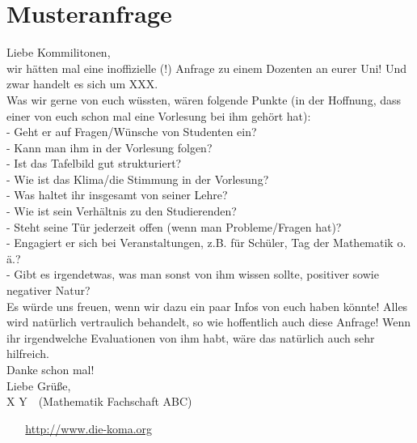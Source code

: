 \documentclass[10pt,twoside,a5paper,openright]{book}
\begin{document}
\section{Musteranfrage}\label{musteranfrage_txt}
\begin{center}
\parbox{0.9\textwidth}{\ttfamily
Liebe Kommilitonen,\medskip\\
wir hätten mal eine inoffizielle (!) Anfrage zu einem Dozenten an eurer Uni! Und zwar handelt es sich um XXX.\medskip\\
Was wir gerne von euch wüssten, wären folgende Punkte (in der Hoffnung, dass einer von euch schon mal eine Vorlesung bei ihm gehört hat):\smallskip\\
- Geht er auf Fragen/Wünsche von Studenten ein?\\
- Kann man ihm in der Vorlesung folgen?\\
- Ist das Tafelbild gut strukturiert?\\
- Wie ist das Klima/die Stimmung in der Vorlesung?\\
- Was haltet ihr insgesamt von seiner Lehre?\\
- Wie ist sein Verhältnis zu den Studierenden?\\
- Steht seine Tür jederzeit offen (wenn man Probleme/Fragen hat)?\\
- Engagiert er sich bei Veranstaltungen, z.B. für Schüler, Tag der Mathematik o.\,ä.?\\
- Gibt es irgendetwas, was man sonst von ihm wissen sollte, positiver sowie negativer Natur?\smallskip\\
Es würde uns freuen, wenn wir dazu ein paar Infos von euch haben könnte! Alles wird natürlich vertraulich behandelt, so wie hoffentlich auch diese Anfrage! Wenn ihr irgendwelche Evaluationen von ihm habt, wäre das natürlich auch sehr hilfreich.\medskip\\
Danke schon mal!\medskip\\
Liebe Grüße,\\
X Y\ \ (Mathematik Fachschaft ABC)
}
\end{center}
\newpage
\pagestyle{empty}~
\newpage
\pagestyle{empty}~
\vfill
\centering\url{http://www.die-koma.org}
\end{document}

